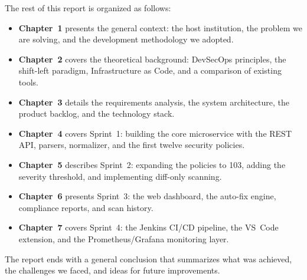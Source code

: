 \vspace{0.5cm}

\noindent The rest of this report is organized as follows:

\begin{itemize}[leftmargin=1.5cm]
  \item \textbf{Chapter~1} presents the general context: the host institution, the problem we are solving, and the development methodology we adopted.
  
  \item \textbf{Chapter~2} covers the theoretical background: DevSecOps principles, the shift-left paradigm, Infrastructure as Code, and a comparison of existing tools.
  
  \item \textbf{Chapter~3} details the requirements analysis, the system architecture, the product backlog, and the technology stack.
  
  \item \textbf{Chapter~4} covers Sprint~1: building the core microservice with the REST API, parsers, normalizer, and the first twelve security policies.
  
  \item \textbf{Chapter~5} describes Sprint~2: expanding the policies to 103, adding the severity threshold, and implementing diff-only scanning.
  
  \item \textbf{Chapter~6} presents Sprint~3: the web dashboard, the auto-fix engine, compliance reports, and scan history.
  
  \item \textbf{Chapter~7} covers Sprint~4: the Jenkins CI/CD pipeline, the VS~Code extension, and the Prometheus/Grafana monitoring layer.
\end{itemize}

\noindent The report ends with a general conclusion that summarizes what was achieved, the challenges we faced, and ideas for future improvements.
